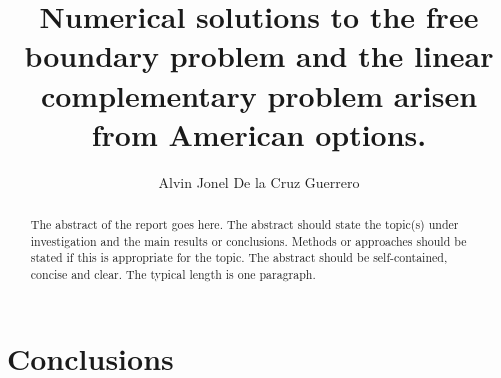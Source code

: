 \documentclass{uonmathreport}
\title{Numerical solutions to the free boundary problem and the linear complementary problem 
arisen from American options.}
\author{Alvin Jonel De la Cruz Guerrero}
\begin{document}
\maketitle

\begin{abstract}
The abstract of the report goes here. The abstract should state the
topic(s) under investigation and the main results or
conclusions. Methods or approaches should be stated if this is
appropriate for the topic. The abstract should be self-contained,
concise and clear. The typical length is one paragraph.
\end{abstract}

\setcounter{tocdepth}{3}  %
\tableofcontents 
\newpage










\section{Conclusions} \label{sec:conclusions}

\newpage

\appendix

\newpage

\printbibliography
\end{document}
